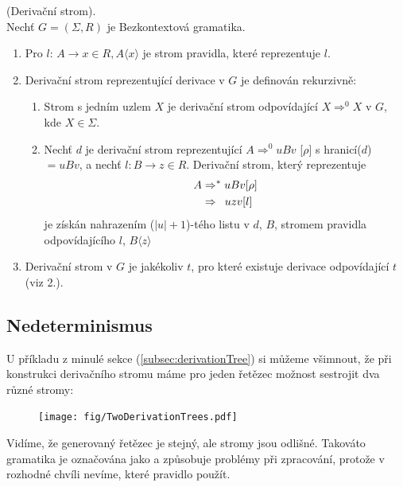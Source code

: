 \begin{defn}
  (Derivační strom). \cite[str. 92]{MedunaIFJ}\\
  Nechť $G = (\Sigma, R)$ je Bezkontextová gramatika.\\
  \begin{enumerate}
    \item Pro $l$: $A \rightarrow x \in R, A\langle x\rangle$ je strom pravidla, které reprezentuje $l$.
    \item Derivační strom reprezentující derivace v $G$ je definován rekurzivně:
    \begin{enumerate}
      \item Strom s jedním uzlem $X$ je derivační strom odpovídající $X \Rightarrow^0 X$ v $G$, kde $X \in \Sigma$.
      \item Nechť $d$ je derivační strom reprezentující
            $A \Rightarrow^0 uBv$ [$\rho$] s hranicí($d$) $ = uBv$, a nechť $l: B \rightarrow z \in R$.
            Derivační strom, který reprezentuje
            \begin{align}
                A & \Rightarrow^* uBv [\rho] \nonumber\\
                  & \Rightarrow \hphantom{*} uzv [l] \nonumber
            \end{align}
            je získán nahrazením ($|u|+1$)-tého listu v $d$, $B$, stromem pravidla odpovídajícího $l$, $B\langle z\rangle$
    \end{enumerate}
    \item Derivační strom v $G$ je jakékoliv $t$, pro které existuje derivace odpovídající $t$ (viz 2.).
  \end{enumerate}
  \vspace{-0.2cm}
\end{defn}

\subsection{Nedeterminismus}
\label{subec:nondeterminsm}

U příkladu z minulé sekce (\ref{subsec:derivationTree}) si můžeme všimnout,
že při konstrukci derivačního stromu máme pro jeden řetězec možnost sestrojit
dva různé stromy:

\begin{figure}[H]
  \centering
  \texttt{[image: fig/TwoDerivationTrees.pdf]}
\end{figure}

Vidíme, že generovaný řetězec je stejný, ale stromy jsou odlišné.
Takováto gramatika je označována jako  a způsobuje problémy při
zpracování, protože v rozhodné chvíli nevíme, které pravidlo použít.\\

